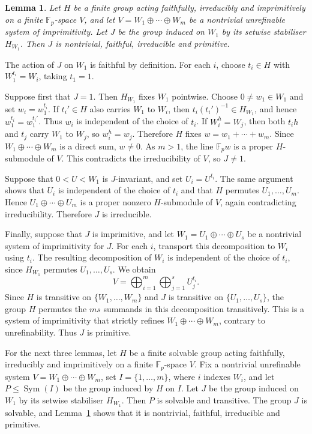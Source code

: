 \documentclass[10pt]{amsart}
\newtheorem{lemma}[theorem]{Lemma}
\theoremstyle{definition}
\renewcommand{\leq}{\leqslant}
\let\oldendproof\endproof
\renewenvironment{proof}[1][\proofname]{%
  \oldproof[\bfseries #1]%
}{\oldendproof}
\DeclareMathOperator{\Sym}{Sym}
\numberwithin{equation}{section}
\numberwithin{table}{section}
\begin{document}
\begin{lemma}\label{lem:unrefinable-blocks}
Let $H$ be a finite group acting faithfully, irreducibly and imprimitively
on a finite $\mathbb{F}_p$-space $V$, and let
$V=W_1\oplus\cdots\oplus W_m$ be a nontrivial unrefinable system of
imprimitivity. Let $J$ be the group induced on $W_1$ by its setwise
stabiliser $H_{W_1}$. Then $J$ is nontrivial, faithful, irreducible and
primitive.
\end{lemma}

\begin{proof}
The action of $J$ on $W_1$ is faithful by definition. For each $i$, choose
$t_i\in H$ with $W_1^{t_i}=W_i$, taking $t_1=1$.

Suppose first that $J=1$. Then $H_{W_1}$ fixes $W_1$ pointwise. Choose
$0\ne w_1\in W_1$ and set $w_i=w_1^{t_i}$. If $t_i'\in H$ also carries
$W_1$ to $W_i$, then $t_i(t_i')^{-1}\in H_{W_1}$, and hence
$w_1^{t_i}=w_1^{t_i'}$. Thus $w_i$ is independent of the choice of $t_i$.
If $W_i^h=W_j$, then both $t_ih$ and $t_j$ carry $W_1$ to $W_j$, so
$w_i^h=w_j$. Therefore $H$ fixes
$w=w_1+\cdots+w_m$. Since $W_1\oplus\cdots\oplus W_m$ is a direct sum,
$w\ne0$. As $m>1$, the line $\mathbb{F}_p w$ is a proper $H$-submodule of
$V$. This contradicts the irreducibility of $V$, so $J\ne1$.

Suppose that $0<U<W_1$ is $J$-invariant, and set $U_i=U^{t_i}$. The same
argument shows that $U_i$ is independent of the choice of $t_i$ and that
$H$ permutes $U_1,\ldots,U_m$. Hence
$U_1\oplus\cdots\oplus U_m$ is a proper nonzero $H$-submodule of $V$,
again contradicting irreducibility. Therefore $J$ is irreducible.

Finally, suppose that $J$ is imprimitive, and let
$W_1=U_1\oplus\cdots\oplus U_s$ be a nontrivial system of imprimitivity
for $J$. For each $i$, transport
this decomposition to $W_i$ using $t_i$. The resulting decomposition of
$W_i$ is independent of the choice of $t_i$, since $H_{W_1}$ permutes
$U_1,\ldots,U_s$. We obtain
$$
  V=\bigoplus_{i=1}^m\bigoplus_{j=1}^s U_j^{t_i}.
$$
Since $H$ is transitive on $\{W_1,\ldots,W_m\}$ and $J$ is transitive on
$\{U_1,\ldots,U_s\}$, the group $H$ permutes the $ms$ summands in this
decomposition transitively.
This is a system of imprimitivity that strictly refines
$W_1\oplus\cdots\oplus W_m$, contrary to unrefinability. Thus $J$ is
primitive.
\end{proof}

For the next three lemmas, let $H$ be a finite solvable group acting
faithfully, irreducibly and imprimitively on a finite $\mathbb{F}_p$-space
$V$. Fix a nontrivial unrefinable system
$V=W_1\oplus\cdots\oplus W_m$, set $I=\{1,\ldots,m\}$, where $i$
indexes $W_i$, and let $P\leq\Sym(I)$ be the group induced by $H$ on
$I$. Let $J$ be the group induced on $W_1$ by its setwise stabiliser
$H_{W_1}$. Then $P$ is solvable and transitive. The group $J$ is
solvable, and Lemma~\ref{lem:unrefinable-blocks} shows that it is
nontrivial, faithful, irreducible and primitive.
\end{document}
